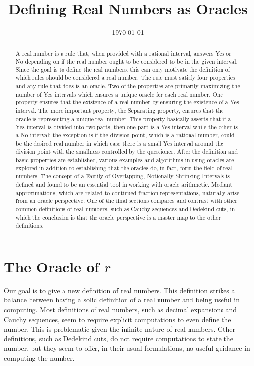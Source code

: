 \documentclass[12pt]{article}
\title{Defining Real Numbers as Oracles}
\date{\today}
\begin{document}
\maketitle
\begin{abstract}
A real number is a rule that, when provided with a rational interval, answers Yes or No depending on if the real number ought to be considered to be in the given interval. Since the goal is to define the real numbers, this can only motivate the definition of which rules should be considered a real number. The rule must satisfy four properties and any rule that does is an oracle. Two of the properties are primarily maximizing the number of Yes intervals which ensures a unique oracle for each real number. One property ensures that the existence of a real number by ensuring the existence of a Yes interval. The more important property, the Separating property, ensures that the oracle is representing a unique real number. This property basically asserts that if a Yes interval is divided into two parts, then one part is a Yes interval while the other is a No interval; the exception is if the division point, which is a rational number, could be the desired real number in which case there is a small Yes interval around the division point with the smallness controlled by the questioner. After the definition and basic properties are established, various examples and algorithms in using oracles are explored in addition to establishing that the oracles do, in fact, form the field of real numbers. The concept of a Family of Overlapping, Notionally Shrinking Intervals is defined and found to be an essential tool in working with oracle arithmetic. Mediant approximations, which are related to continued fraction representations, naturally arise from an oracle perspective. One of the final sections compares and contrast with other common definitions of real numbers, such as Cauchy sequences and Dedekind cuts, in which the conclusion is that the oracle perspective is a master map to the other definitions. 
\end{abstract}

\tableofcontents

\section{The Oracle of \texorpdfstring{$r$}{r}}\label{sec:ora}

Our goal is to give a new definition of real numbers. This definition strikes a balance between having a solid definition of a real number and being useful in computing. Most definitions of real numbers, such as decimal expansions and Cauchy sequences, seem to require explicit computations to even define the number. This is problematic given the infinite nature of real numbers. Other definitions, such as Dedekind cuts, do not require computations to state the number, but they seem to offer, in their usual formulations, no useful guidance in computing the number. 
\end{document}
